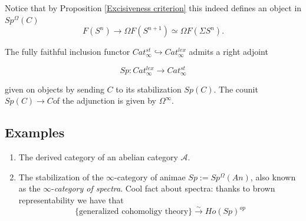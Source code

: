 Notice that by Proposition \ref{Excisiveness criterion} this indeed defines an object in $Sp^{\Omega}(C)$
\[F(S^n)\to \Omega F(S^{n+1})\simeq \Omega F(\Sigma S^{n}).\]

\begin{proposition}
    The fully faithful inclusion functor 
    $Cat^{st}_\infty\hookrightarrow Cat^{lex}_\infty$ admits a right adjoint

 \[Sp:Cat^{lex}_\infty\to Cat^{st}_\infty\]

given on objects by sending $C$ to its stabilization $Sp(C)$. The counit $Sp(C)\to C$of the adjunction
is given by $\Omega^\infty$.
\end{proposition}

\subsection{Examples}
\begin{enumerate}[label=\arabic*)]
    \item The derived category of an abelian category $\mathcal{A}.$
    \item The stabilization of the $\infty$-category of animae $Sp:=Sp^\Omega(An)$, also known as the $\infty$-\emph{category of spectra}. Cool fact about spectra: thanks to brown representability we have that
    \[\{\text{generalized cohomoligy theory}\}\overset{\sim}{\longrightarrow}Ho(Sp)^{op}\]
\end{enumerate}

